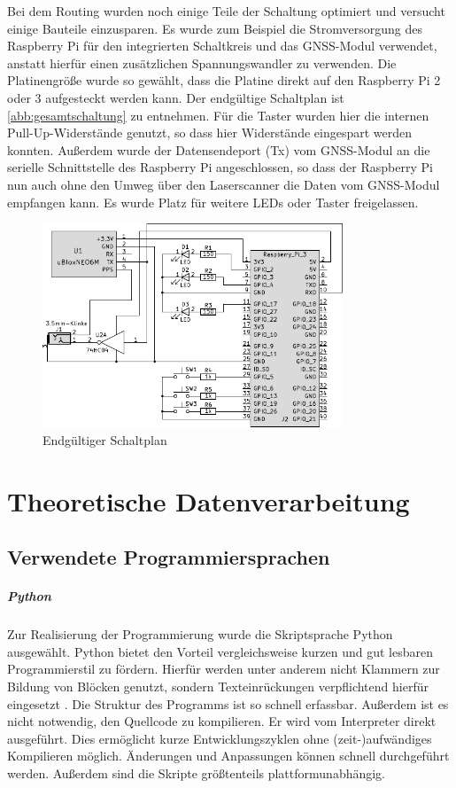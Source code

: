 \documentclass[a4paper,12pt,bibliography=totoc, listof=totoc,titlepage,pointlessnumbers]{scrreprt}
\begin{document}
Bei dem Routing wurden noch einige Teile der Schaltung optimiert und versucht einige Bauteile einzusparen. Es wurde zum Beispiel die Stromversorgung des Rasp\-berry Pi für den integrierten Schaltkreis und das GNSS-Modul verwendet, anstatt hierfür einen zusätzlichen Spannungswandler zu verwenden. Die Platinengröße wurde so gewählt, dass die Platine direkt auf den Rasp\-berry Pi 2 oder 3 aufgesteckt werden kann. Der endgültige Schaltplan ist \autoref{abb:gesamtschaltung} zu entnehmen. Für die Taster wurden hier die internen Pull-Up-Widerstände genutzt, so dass hier Widerstände eingespart werden konnten. Außerdem wurde der Datensendeport (Tx) vom GNSS-Modul an die serielle Schnittstelle des Rasp\-berry Pi angeschlossen, so dass der Rasp\-berry Pi nun auch ohne den Umweg über den Laser\-scan\-ner die Daten vom GNSS-Modul empfangen kann. Es wurde Platz für weitere LEDs oder Taster freigelassen.

\begin{figure}[!ht]
 \centering
 \includegraphics[width=0.8\textwidth]{img/schaltplanGesamt.pdf}
 \caption{Endgültiger Schaltplan}
 \label{abb:gesamtschaltung}
\end{figure}

\chapter{Theoretische Datenverarbeitung}
\label{c:datenverarbeitung}

\section{Verwendete Programmiersprachen}
\paragraph{Python}
Zur Realisierung der Programmierung wurde die Skriptsprache Python ausgewählt. Python bietet den Vorteil vergleichsweise kurzen und gut lesbaren Programmierstil zu fördern. Hierfür werden unter anderem nicht Klammern zur Bildung von Blöcken genutzt, sondern Texteinrückungen verpflichtend hierfür eingesetzt \citep[S. 13f]{python}. Die Struktur des Programms ist so schnell erfassbar. Außerdem ist es nicht notwendig, den Quellcode zu kompilieren. Er wird vom Interpreter direkt ausgeführt. Dies ermöglicht kurze Entwicklungszyklen ohne (zeit-)aufwändiges Kompilieren möglich. Änderungen und Anpassungen können schnell durchgeführt werden. Außerdem sind die Skripte größtenteils plattformunabhängig.
\end{document}
